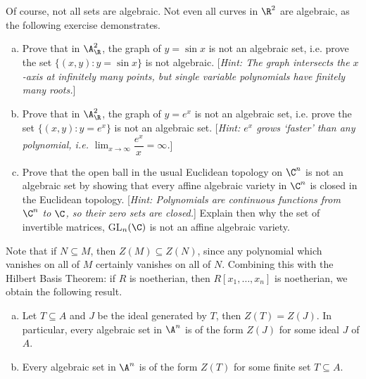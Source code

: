 Of course, not all sets are algebraic. Not even all curves in $\R^2$ are algebraic, as the following exercise demonstrates. 


\begin{exc} \hfill
\begin{enumerate}[(a)]
\item Prove that in $\A^2_\R$, the graph of $y= \sin x$ is not an algebraic set, i.e. prove the set $\{ (x,y) \colon y= \sin x \}$ is not algebraic. [{\em Hint: The graph intersects the $x$-axis at infinitely many points, but single variable polynomials have finitely many roots.}]

\item Prove that in $\A^2_\R$, the graph of $y= e^x$ is not an algebraic set, i.e. prove the set $\{ (x,y) \colon y= e^x \}$ is not an algebraic set. [{\em Hint: $e^x$ grows `faster' than any polynomial, i.e. $\displaystyle \lim_{x \to \infty} \dfrac{e^x}{x}= \infty$.}]

\item Prove that the open ball in the usual Euclidean topology on $\C^n$ is not an algebraic set by showing that every affine algebraic variety in $\C^n$ is closed in the Euclidean topology. [{\em Hint: Polynomials are continuous functions from $\C^n$ to $\C$, so their zero sets are closed.}] Explain then why the set of invertible matrices, GL$_n(\C)$ is not an affine algebraic variety.
\end{enumerate}
\end{exc}


Note that if $N \subseteq M$, then $Z(M) \subseteq Z(N)$, since any polynomial which  vanishes on all of $M$ certainly vanishes on all of $N$. Combining this with the Hilbert Basis Theorem: if $R$ is noetherian, then $R[x_1,\ldots,x_n]$ is noetherian, we obtain the following result.


\begin{prop} \label{prop:basic_affine} \hfill
\begin{enumerate}[(a)]
\item Let $T \subseteq A$ and $J$ be the ideal generated by $T$, then $Z(T)= Z(J)$. In particular, every algebraic set in $\A^n$ is of the form $Z(J)$ for some ideal $J$ of $A$. 
\item Every algebraic set in $\A^n$ is of the form $Z(T)$ for some finite set $T \subseteq A$.
\end{enumerate}
\end{prop}

